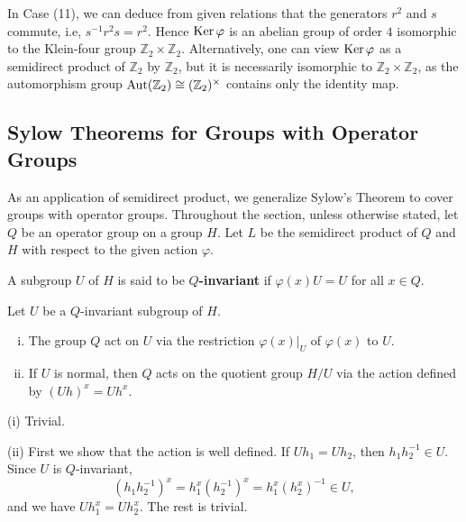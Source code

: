 \begin{remark}
	In Case (11), we can deduce from given relations that the generators $r^2$ and $s$ commute, i.e, $s^{-1}r^2s = r^2$. Hence $\operatorname{Ker}\varphi$ is an abelian group of order $4$ isomorphic to the Klein-four group $\mathbb{Z}_2\times \mathbb{Z}_2$. Alternatively, one can view $\operatorname{Ker} \varphi$ as a semidirect product of $\mathbb{Z}_2$ by $\mathbb{Z}_2$, but it is necessarily isomorphic to $\mathbb{Z}_2\times \mathbb{Z}_2$, as the automorphism group $\operatorname{Aut}(\mathbb{Z}_2) \cong (\mathbb{Z}_2)^{\times}$ contains only the identity map.
\end{remark}



\subsection{Sylow Theorems for Groups with Operator Groups}
As an application of semidirect product, we generalize Sylow's Theorem to cover groups with operator groups. 
 Throughout the section, unless otherwise stated, let $Q$ be an operator group on a group $H$. Let $L$ be the semidirect product of $Q$ and $H$ with respect to the given action $\varphi$. 
\begin{definition}
	A subgroup $U$ of $H$ is said to be \textbf{$Q$-invariant} if $\varphi(x)U = U$ for all $x\in Q$.
\end{definition}
\begin{proposition} \label{prop-Q-act-on-invariant-subgroup}
	 Let $U$ be a $Q$-invariant subgroup of $H$. 
	\begin{enumerate}[(i)]
		\item The group $Q$ act on $U$ via  the restriction $\varphi(x)|_{U}$ of $\varphi(x)$ to $U$.
		\item If $U$ is normal, then $Q$ acts on the quotient group $H/U$ via the action defined by $(Uh)^x = Uh^x$.
	\end{enumerate}
	\begin{sketch}
		(i) Trivial.
		
		(ii) First we show that the action is well defined. If $Uh_1 = Uh_2$, then $h_1h_2^{-1} \in U$. Since $U$ is $Q$-invariant,
		$$(h_1h_2^{-1})^x = h_1^x(h_2^{-1})^x = h_1^x(h_2^x)^{-1} \in U,$$
		and we have $Uh_1^x = Uh_2^x$. %
		The rest is trivial.
	\end{sketch}
\end{proposition}
